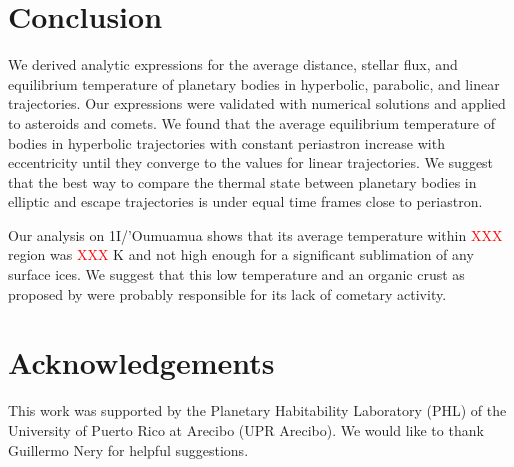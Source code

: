 \documentclass[a4paper,fleqn,usenatbib]{mnras}
\newcommand{\fix}{\textcolor{red}}
\begin{document}

\section{Conclusion}
\label{sec:conclusion}


We derived analytic expressions for the average distance, stellar flux, and equilibrium temperature of planetary bodies in hyperbolic, parabolic, and linear trajectories. Our expressions were validated with numerical solutions and applied to asteroids and comets. We found that the average equilibrium temperature of bodies in hyperbolic trajectories with constant periastron increase with eccentricity until they converge to the values for linear trajectories. We suggest that the best way to compare the thermal state between planetary bodies in elliptic and escape trajectories is under equal time frames close to periastron.


Our analysis on 1I/'Oumuamua shows that its average temperature within \fix{XXX} region was \fix{XXX} K and not high enough for a significant sublimation of any surface ices. We suggest that this low temperature and an organic crust as proposed by \citet{2017arXiv171206552F} were probably responsible for its lack of cometary activity.


\section*{Acknowledgements}

This work was supported by the Planetary Habitability Laboratory (PHL) of the University of Puerto Rico at Arecibo (UPR Arecibo). We would like to thank Guillermo Nery for helpful suggestions.




%

\end{document}
